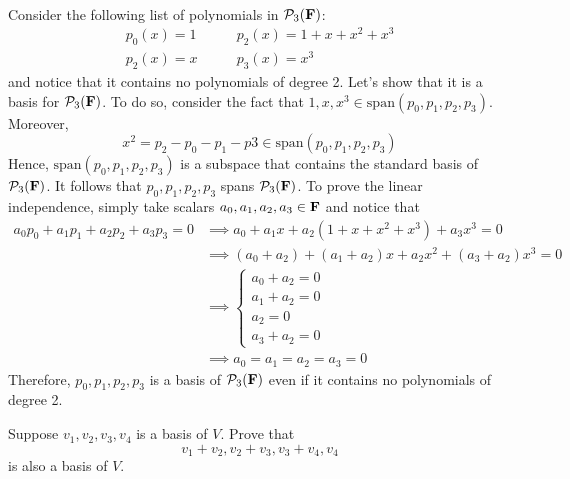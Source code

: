 \begin{solution}
    \\ Consider the following list of polynomials in $\mathcal{P}_3(\mathbf{F})$:
    \begin{align*}
        p_0(x) = 1 &\qquad p_2(x) = 1 + x + x^2 + x^3 \\
        p_2(x) = x &\qquad p_3(x) = x^3
    \end{align*}
    and notice that it contains no polynomials of degree 2. Let's show that it is a basis for $\mathcal{P}_3(\mathbf{F})$. To do so, consider the fact that $1,x,x^3 \in \text{span}(p_0, p_1, p_2, p_3)$. Moreover,
    $$x^2 = p_2 - p_0 - p_1 - p3 \in \text{span}(p_0, p_1, p_2, p_3)$$
    Hence, $\text{span}(p_0, p_1, p_2, p_3)$ is a subspace that contains the standard basis of $\mathcal{P}_3(\mathbf{F})$. It follows that $p_0, p_1, p_2, p_3$ spans $\mathcal{P}_3(\mathbf{F})$. To prove the linear independence, simply take scalars $a_0, a_1, a_2, a_3 \in \mathbf{F}$ and notice that
    \begin{align*}
        a_0 p_0 + a_1 p_1 + a_2 p_2 + a_3 p_3 = 0 &\implies a_0 + a_1x + a_2(1 + x + x^2 + x^3) + a_3x^3 = 0 \\
        &\implies (a_0 + a_2) + (a_1 + a_2)x + a_2x^2 + (a_3 + a_2)x^3 = 0 \\
        &\implies \begin{cases}
            a_0 + a_2 = 0 \\ a_1 + a_2 = 0 \\ a_2 = 0 \\ a_3 + a_2 = 0
        \end{cases}\\
        &\implies a_0 = a_1 = a_2 = a_3 = 0
    \end{align*}
    Therefore, $p_0, p_1, p_2, p_3$ is a basis of $\mathcal{P}_3(\mathbf{F})$ even if it contains no polynomials of degree 2. \\
\end{solution}

\begin{exercise}
    Suppose $v_1, v_2, v_3, v_4$ is a basis of $V$. Prove that
    $$v_1 + v_2, v_2 + v_3, v_3 + v_4, v_4$$
    is also a basis of $V$.\\
\end{exercise}

